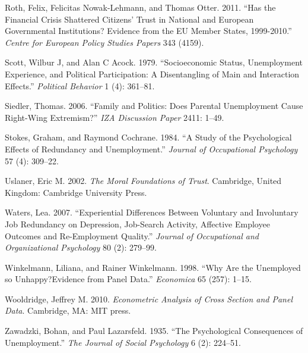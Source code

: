 \documentclass[12pt,]{article}
\begin{document}
\leavevmode\hypertarget{ref-Roth2011-nb}{}%
Roth, Felix, Felicitas Nowak-Lehmann, and Thomas Otter. 2011. ``Has the Financial Crisis Shattered Citizens' Trust in National and European Governmental Institutions? Evidence from the EU Member States, 1999-2010.'' \emph{Centre for European Policy Studies Papers} 343 (4159).

\leavevmode\hypertarget{ref-Scott1979-aw}{}%
Scott, Wilbur J, and Alan C Acock. 1979. ``Socioeconomic Status, Unemployment Experience, and Political Participation: A Disentangling of Main and Interaction Effects.'' \emph{Political Behavior} 1 (4): 361--81.

\leavevmode\hypertarget{ref-Siedler2006-yw}{}%
Siedler, Thomas. 2006. ``Family and Politics: Does Parental Unemployment Cause Right-Wing Extremism?'' \emph{IZA Discussion Paper} 2411: 1--49.

\leavevmode\hypertarget{ref-Stokes1984-so}{}%
Stokes, Graham, and Raymond Cochrane. 1984. ``A Study of the Psychological Effects of Redundancy and Unemployment.'' \emph{Journal of Occupational Psychology} 57 (4): 309--22.

\leavevmode\hypertarget{ref-Uslaner2002-ks}{}%
Uslaner, Eric M. 2002. \emph{The Moral Foundations of Trust}. Cambridge, United Kingdom: Cambridge University Press.

\leavevmode\hypertarget{ref-Waters2007-os}{}%
Waters, Lea. 2007. ``Experiential Differences Between Voluntary and Involuntary Job Redundancy on Depression, Job-Search Activity, Affective Employee Outcomes and Re-Employment Quality.'' \emph{Journal of Occupational and Organizational Psychology} 80 (2): 279--99.

\leavevmode\hypertarget{ref-Winkelmann1998-kb}{}%
Winkelmann, Liliana, and Rainer Winkelmann. 1998. ``Why Are the Unemployed so Unhappy?Evidence from Panel Data.'' \emph{Economica} 65 (257): 1--15.

\leavevmode\hypertarget{ref-Wooldridge2010-jb}{}%
Wooldridge, Jeffrey M. 2010. \emph{Econometric Analysis of Cross Section and Panel Data}. Cambridge, MA: MIT press.

\leavevmode\hypertarget{ref-Zawadzki1935-gg}{}%
Zawadzki, Bohan, and Paul Lazarsfeld. 1935. ``The Psychological Consequences of Unemployment.'' \emph{The Journal of Social Psychology} 6 (2): 224--51.
\end{document}
